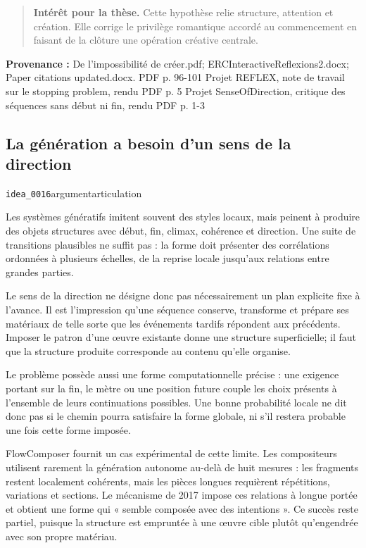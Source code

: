 \documentclass[10pt,a4paper]{article}
\begin{document}
\begin{quote}
\textbf{Intérêt pour la thèse.} Cette hypothèse relie structure, attention et création. Elle corrige le privilège romantique accordé au commencement en faisant de la clôture une opération créative centrale.
\end{quote}
{\footnotesize\color{metadata}\textbf{Provenance :} De l'impossibilité de créer.pdf; ERCInteractiveReflexions2.docx; Paper citations updated.docx. PDF p. 96-101 Projet REFLEX, note de travail sur le stopping problem, rendu PDF p. 5 Projet SenseOfDirection, critique des séquences sans début ni fin, rendu PDF p. 1-3\par}

\subsection{La génération a besoin d'un sens de la direction}
{\small\color{metadata} \texttt{idea\_0016}\quad\textbullet\quad argument\quad\textbullet\quad articulation\par}

Les systèmes génératifs imitent souvent des styles locaux, mais peinent à produire des objets structures avec début, fin, climax, cohérence et direction. Une suite de transitions plausibles ne suffit pas : la forme doit présenter des corrélations ordonnées à plusieurs échelles, de la reprise locale jusqu'aux relations entre grandes parties.

Le sens de la direction ne désigne donc pas nécessairement un plan explicite fixe à l'avance. Il est l'impression qu'une séquence conserve, transforme et prépare ses matériaux de telle sorte que les événements tardifs répondent aux précédents. Imposer le patron d'une œuvre existante donne une structure superficielle; il faut que la structure produite corresponde au contenu qu'elle organise.

Le problème possède aussi une forme computationnelle précise : une exigence portant sur la fin, le mètre ou une position future couple les choix présents à l'ensemble de leurs continuations possibles. Une bonne probabilité locale ne dit donc pas si le chemin pourra satisfaire la forme globale, ni s'il restera probable une fois cette forme imposée.

FlowComposer fournit un cas expérimental de cette limite. Les compositeurs utilisent rarement la génération autonome au-delà de huit mesures : les fragments restent localement cohérents, mais les pièces longues requièrent répétitions, variations et sections. Le mécanisme de 2017 impose ces relations à longue portée et obtient une forme qui « semble composée avec des intentions ». Ce succès reste partiel, puisque la structure est empruntée à une œuvre cible plutôt qu'engendrée avec son propre matériau.
\end{document}
